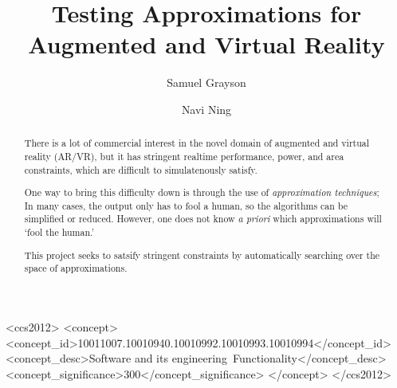 \documentclass[sigconf,review,screen]{acmart}
\begin{document}
\title{Testing Approximations for Augmented and Virtual Reality}

\author{Samuel Grayson}

\author{Navi Ning}

\renewcommand\footnotetextcopyrightpermission[1]{} %

\newcommand{\todo}[1]{\textcolor{red}{#1}}

\begin{abstract}
There is a lot of commercial interest in the novel domain of augmented and virtual reality (AR/VR), but it has stringent realtime performance, power, and area constraints, which are difficult to simulatenously satisfy.

  One way to bring this difficulty down is through the use of \textit{approximation techniques}; In many cases, the output only has to fool a human, so the algorithms can be simplified or reduced. However, one does not know \textit{a priori} which approximations will `fool the human.'

  This project seeks to satsify stringent constraints by automatically searching over the space of approximations.
\end{abstract}

\begin{CCSXML}
<ccs2012>
<concept>
<concept_id>10011007.10010940.10010992.10010993.10010994</concept_id>
<concept_desc>Software and its engineering~Functionality</concept_desc>
<concept_significance>300</concept_significance>
</concept>
</ccs2012>
\end{CCSXML}



\maketitle




% 
% 
% 
% 
\end{document}

